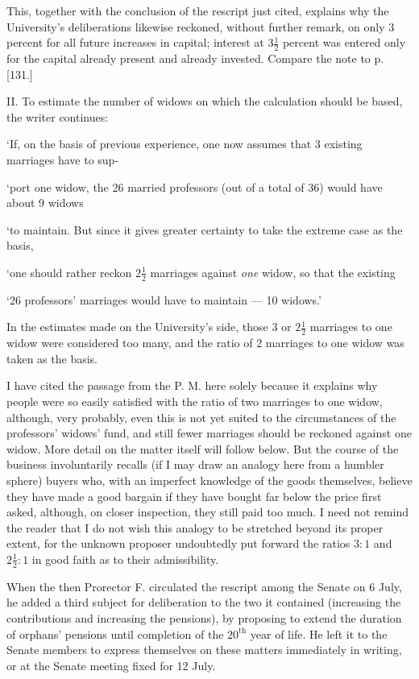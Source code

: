This, together with the conclusion of the rescript just cited, explains why the University's deliberations likewise reckoned, without further remark, on only 3 percent for all future increases in capital; interest at \(3\tfrac12\) percent was entered only for the capital already present and already invested. Compare the note to p. [131.]

II. To estimate the number of widows on which the calculation should be based, the writer continues:

‘If, on the basis of previous experience, one now assumes that 3 existing marriages have to sup-\par
\noindent ‘port one widow, the 26 married professors (out of a total of 36) would have about 9 widows\par
\noindent ‘to maintain. But since it gives greater certainty to take the extreme case as the basis,\par
\noindent ‘one should rather reckon \(2\tfrac12\) marriages against \textit{one} widow, so that the existing\par
\noindent ‘26 professors' marriages would have to maintain — 10 widows.’
\par{}
In the estimates made on the University's side, those 3 or \(2\tfrac12\) marriages to one widow were considered too many, and the ratio of 2 marriages to one widow was taken as the basis.

I have cited the passage from the P. M. here solely because it explains why people were so easily satisfied with the ratio of two marriages to one widow, although, very probably, even this is not yet suited to the circumstances of the professors' widows' fund, and still fewer marriages should be reckoned against one widow. More detail on the matter itself will follow below. But the course of the business involuntarily recalls (if I may draw an analogy here from a humbler sphere) buyers who, with an imperfect knowledge of the goods themselves, believe they have made a good bargain if they have bought far below the price first asked, although, on closer inspection, they still paid too much. I need not remind the reader that I do not wish this analogy to be stretched beyond its proper extent, for the unknown proposer undoubtedly put forward the ratios \(3:1\) and \(2\tfrac12:1\) in good faith as to their admissibility.

When the then Prorector F. circulated the rescript among the Senate on 6 July, he added a third subject for deliberation to the two it contained (increasing the contributions and increasing the pensions), by proposing to extend the duration of orphans' pensions until completion of the \(20^{\text{th}}\) year of life. He left it to the Senate members to express themselves on these matters immediately in writing, or at the Senate meeting fixed for 12 July.

